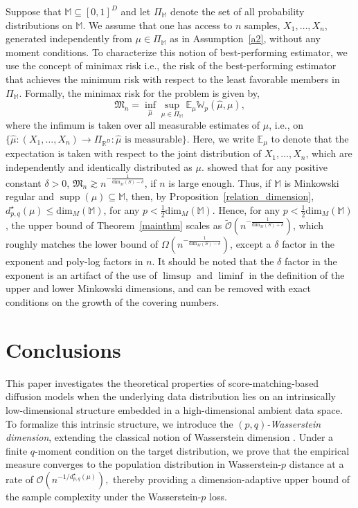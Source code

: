 \documentclass[12pts]{article}
\def\Real{\mathop{\mathbb{R}}\nolimits}
\newcommand{\cO}{ \mathcal{O}}
\newcommand{\E}{\mathbb{E}}
\newcommand{\fM}{\mathbb{M}}
\newcommand{\fW}{\mathbb{W}}
\begin{document}
Suppose that $\fM \subseteq [0,1]^D$ and let $\Pi_{\fM}$ denote the set of all probability distributions on $\fM$. We assume that one has access to $n$ samples, $X_1, \dots, X_n$, generated independently from $\mu \in \Pi_{\fM}$ as in Assumption~\ref{a2}, without any moment conditions. To characterize this notion of best-performing estimator, we use the concept of minimax risk i.e., the risk of the best-performing estimator that achieves the minimum risk with respect to the least favorable members in $\Pi_{\fM}$. Formally, the minimax risk for the problem is given by,
\[\mathfrak{M}_n  = \inf_{\hat{\mu}} \sup_{\mu \in \Pi_{\fM}} \E_\mu \fW_p(\hat{\mu},\mu), \]
where the infimum is taken over all measurable estimates of $\mu$, i.e., on $\{\hat{\mu}: (X_1, \dots, X_n) \to \Pi_{\Real^D}: \hat{\mu} \text{ is measurable}\}$.  Here, we write $\E_\mu$ to denote that the expectation is taken with respect to the joint distribution of $X_1, \dots, X_n$, which are independently and identically distributed as  $\mu$. \citet{chakraborty2025minimax} showed that for any positive constant $\delta>0$, $\mathfrak{M}_n \gtrsim n^{-\frac{1}{\underline{\text{dim}}_M(S)-\delta}}$, if $n$ is large enough. Thus, if $\fM$ is Minkowski regular and $\operatorname{supp}(\mu) \subseteq \fM$, then, by Proposition~\ref{relation_dimension}, $d^\star_{p,q}(\mu) \le \text{dim}_M(\fM)$, for any $p < \frac{1}{2}\text{dim}_M(\fM)$. Hence, for any $p < \frac{1}{2}\text{dim}_M(\fM)$, the upper bound of Theorem~\ref{mainthm} scales as $\widetilde{\cO}\left(n^{-\frac{1}{\text{dim}_M(S)+\delta}}\right)$, which roughly matches the lower bound of $\Omega\left(n^{-\frac{1}{\text{dim}_M(S)-\delta}}\right)$, except a $\delta$ factor in the exponent and poly-log factors in $n$. It should be noted that the $\delta$ factor in the exponent is an artifact of the use of $\limsup$ and $\liminf$ in the definition of the upper and lower Minkowski dimensions, and can be removed with exact conditions on the growth of the covering numbers. 
\section{Conclusions}
\label{conclusions}
 This paper investigates the theoretical properties of score-matching-based diffusion models when the underlying data distribution lies on an intrinsically low-dimensional structure embedded in a high-dimensional ambient data space. To formalize this intrinsic structure, we introduce the \emph{$(p,q)$-Wasserstein dimension}, extending the classical notion of Wasserstein dimension \citep{weed2019sharp}. Under a finite $q$-moment condition on the target distribution, we prove that the empirical measure converges to the population distribution in Wasserstein-$p$ distance at a rate of \(\mathcal{O}\!\left(n^{-1/d^\star_{p,q}(\mu)}\right),\)
thereby providing a dimension-adaptive upper bound of the sample complexity under the Wasserstein-$p$ loss.
\end{document}
